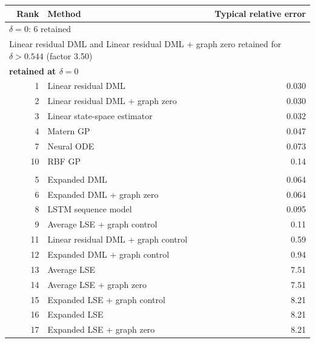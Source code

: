 \begin{tabular}{rlr}
\toprule
Rank & Method & Typical relative error \\
\midrule
\multicolumn{3}{l}{\(\delta=0\): 6 retained} \\
\multicolumn{3}{l}{Linear residual DML and Linear residual DML + graph zero retained for \(\delta>0.544\) (factor 3.50)} \\
\multicolumn{3}{l}{\textbf{retained at \(\delta=0\)}} \\
1 & Linear residual DML & 0.030 \\
2 & Linear residual DML + graph zero & 0.030 \\
3 & Linear state-space estimator & 0.032 \\
4 & Matern GP & 0.047 \\
7 & Neural ODE & 0.073 \\
10 & RBF GP & 0.14 \\
\addlinespace[2pt]
\multicolumn{3}{l}{\textbf{not retained at \(\delta=0\)}} \\
5 & Expanded DML & 0.064 \\
6 & Expanded DML + graph zero & 0.064 \\
8 & LSTM sequence model & 0.095 \\
9 & Average LSE + graph control & 0.11 \\
11 & Linear residual DML + graph control & 0.59 \\
12 & Expanded DML + graph control & 0.94 \\
13 & Average LSE & 7.51 \\
14 & Average LSE + graph zero & 7.51 \\
15 & Expanded LSE + graph control & 8.21 \\
16 & Expanded LSE & 8.21 \\
17 & Expanded LSE + graph zero & 8.21 \\
\bottomrule
\end{tabular}
